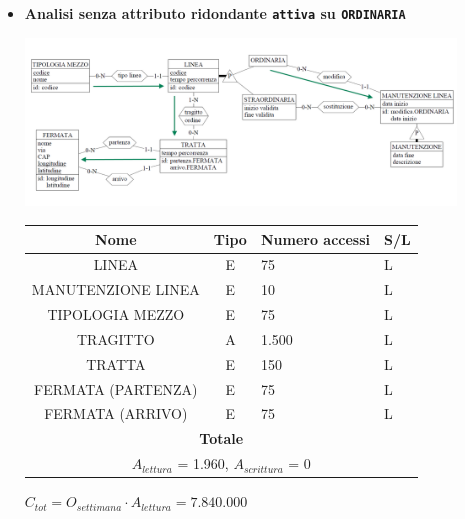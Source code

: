 \documentclass[12pt,a4paper]{report}
\begin{document}
\begin{enumerate}[label=\textbf{\arabic*}]
\begin{itemize}
    \item \textbf{Analisi senza attributo ridondante \texttt{attiva} su \texttt{ORDINARIA}}
    \begin{center}
    \includegraphics[width=0.9\textwidth]{VisualLineeNoRid}
    \end{center}
    \begin{table}[H]
    \centering
    \begin{tabular}{|c|c|l|l|}
    \hline
    \textbf{Nome} & \textbf{Tipo} & \textbf{Numero accessi} & \textbf{S/L} \\
    \hline
    LINEA & E & 75 & L \\
    \hline
    MANUTENZIONE LINEA & E & 10 & L \\
    \hline
    TIPOLOGIA MEZZO & E & 75 & L \\
    \hline
    TRAGITTO & A & 1.500 & L \\
    \hline
    TRATTA & E & 150 & L \\
    \hline
    FERMATA (PARTENZA) & E & 75 & L \\
    \hline
    FERMATA (ARRIVO) & E & 75 & L \\
    \hline
    \multicolumn{4}{c}{\textbf{Totale}} \\
    \multicolumn{4}{c}{${A_{lettura}}$ = 1.960, ${A_{scrittura}}$ = 0} \\
    \hline
    \end{tabular}
    \end{table}
    \begin{center}
    ${C_{tot} = {O_{settimana}}\cdot{A_{lettura}}= 7.840.000}$
    \end{center}
    \end{itemize}



\end{enumerate}
\end{document}
